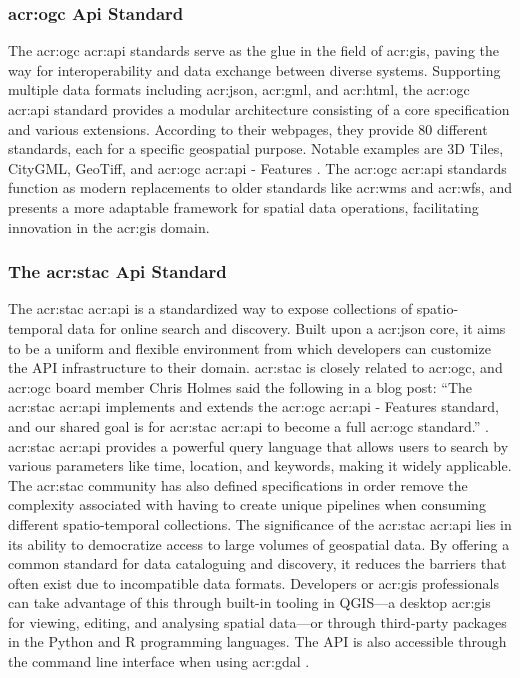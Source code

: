 \subsubsection[OGC Standards]{\acrshort{acr:ogc} Api Standard}\label{subsubsec:ogc}

The \gls{acr:ogc} \acrshort{acr:api} standards serve as the glue in the field of \gls{acr:gis}, paving the way for interoperability and data exchange between diverse systems. Supporting multiple data formats including \acrshort{acr:json}, \acrshort{acr:gml}, and \acrshort{acr:html}, the \gls{acr:ogc} \acrshort{acr:api} standard provides a modular architecture consisting of a core specification and various extensions. According to their webpages, they provide 80 different standards, each for a specific geospatial purpose. Notable examples are 3D Tiles, CityGML, GeoTiff, and \acrshort{acr:ogc} \acrshort{acr:api} - Features \citep{ogcOGCStandards2023}. The \acrshort{acr:ogc} \acrshort{acr:api} standards function as modern replacements to older standards like \acrshort{acr:wms} and \acrshort{acr:wfs}, and presents a more adaptable framework for spatial data operations, facilitating innovation in the \acrshort{acr:gis} domain.

\subsubsection[The STAC Api Standard]{The \acrshort{acr:stac} Api Standard}\label{subsubsec:stac}

The \gls{acr:stac} \acrshort{acr:api} is a standardized way to expose collections of spatio-temporal data for online search and discovery. Built upon a \acrshort{acr:json} core, it aims to be a uniform and flexible environment from which developers can customize the API infrastructure to their domain. \acrshort{acr:stac} is closely related to \acrshort{acr:ogc}, and \acrshort{acr:ogc} board member Chris Holmes said the following in a blog post: \enquote{The \acrshort{acr:stac} \acrshort{acr:api} implements and extends the \gls{acr:ogc} \acrshort{acr:api} - Features standard, and our shared goal is for \gls{acr:stac} \acrshort{acr:api} to become a full \gls{acr:ogc} standard.} \citep{holmesSpatioTemporalAssetCatalogs2021}. \gls{acr:stac} \acrshort{acr:api} provides a powerful query language that allows users to search by various parameters like time, location, and keywords, making it widely applicable. The \acrshort{acr:stac} community has also defined specifications in order remove the complexity associated with having to create unique pipelines when consuming different spatio-temporal collections. The significance of the \gls{acr:stac} \acrshort{acr:api} lies in its ability to democratize access to large volumes of geospatial data. By offering a common standard for data cataloguing and discovery, it reduces the barriers that often exist due to incompatible data formats. Developers or \acrshort{acr:gis} professionals can take advantage of this through built-in tooling in QGIS---a desktop \gls{acr:gis} for viewing, editing, and analysing spatial data---or through third-party packages in the Python and R programming languages. The API is also accessible through the command line interface when using \acrshort{acr:gdal} \citep{STACTutorials}.

